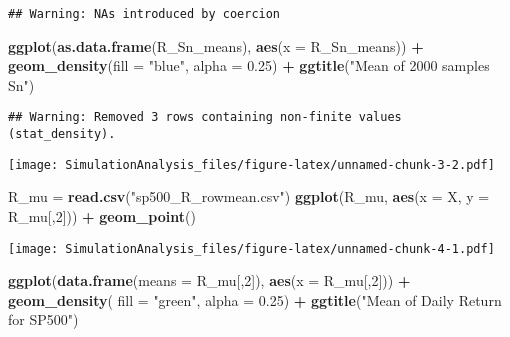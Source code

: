 \documentclass[
]{article}
\newenvironment{Shaded}{\begin{snugshade}}{\end{snugshade}}
\newcommand{\DataTypeTok}[1]{\textcolor[rgb]{0.13,0.29,0.53}{#1}}
\newcommand{\DecValTok}[1]{\textcolor[rgb]{0.00,0.00,0.81}{#1}}
\newcommand{\FloatTok}[1]{\textcolor[rgb]{0.00,0.00,0.81}{#1}}
\newcommand{\KeywordTok}[1]{\textcolor[rgb]{0.13,0.29,0.53}{\textbf{#1}}}
\newcommand{\NormalTok}[1]{#1}
\newcommand{\OperatorTok}[1]{\textcolor[rgb]{0.81,0.36,0.00}{\textbf{#1}}}
\newcommand{\StringTok}[1]{\textcolor[rgb]{0.31,0.60,0.02}{#1}}
\begin{document}
\begin{verbatim}
## Warning: NAs introduced by coercion
\end{verbatim}

\begin{Shaded}
\begin{Highlighting}[]
\KeywordTok{ggplot}\NormalTok{(}\KeywordTok{as.data.frame}\NormalTok{(R_Sn_means), }\KeywordTok{aes}\NormalTok{(}\DataTypeTok{x =}\NormalTok{ R_Sn_means)) }\OperatorTok{+}\StringTok{ }\KeywordTok{geom_density}\NormalTok{(}\DataTypeTok{fill =} \StringTok{"blue"}\NormalTok{, }\DataTypeTok{alpha =} \FloatTok{0.25}\NormalTok{) }\OperatorTok{+}\StringTok{ }\KeywordTok{ggtitle}\NormalTok{(}\StringTok{"Mean of 2000 samples Sn"}\NormalTok{)}
\end{Highlighting}
\end{Shaded}

\begin{verbatim}
## Warning: Removed 3 rows containing non-finite values (stat_density).
\end{verbatim}

\texttt{[image: SimulationAnalysis\_files/figure-latex/unnamed-chunk-3-2.pdf]}

\begin{Shaded}
\begin{Highlighting}[]
\NormalTok{R_mu =}\StringTok{ }\KeywordTok{read.csv}\NormalTok{(}\StringTok{"sp500_R_rowmean.csv"}\NormalTok{)}
\KeywordTok{ggplot}\NormalTok{(R_mu, }\KeywordTok{aes}\NormalTok{(}\DataTypeTok{x =}\NormalTok{ X, }\DataTypeTok{y =}\NormalTok{ R_mu[,}\DecValTok{2}\NormalTok{])) }\OperatorTok{+}\StringTok{ }\KeywordTok{geom_point}\NormalTok{()}
\end{Highlighting}
\end{Shaded}

\texttt{[image: SimulationAnalysis\_files/figure-latex/unnamed-chunk-4-1.pdf]}

\begin{Shaded}
\begin{Highlighting}[]
\KeywordTok{ggplot}\NormalTok{(}\KeywordTok{data.frame}\NormalTok{(}\DataTypeTok{means =}\NormalTok{ R_mu[,}\DecValTok{2}\NormalTok{]), }\KeywordTok{aes}\NormalTok{(}\DataTypeTok{x =}\NormalTok{ R_mu[,}\DecValTok{2}\NormalTok{])) }\OperatorTok{+}\StringTok{ }\KeywordTok{geom_density}\NormalTok{( }\DataTypeTok{fill =} \StringTok{"green"}\NormalTok{, }\DataTypeTok{alpha =} \FloatTok{0.25}\NormalTok{) }\OperatorTok{+}\StringTok{ }\KeywordTok{ggtitle}\NormalTok{(}\StringTok{"Mean of Daily Return for SP500"}\NormalTok{)}
\end{Highlighting}
\end{Shaded}
\end{document}
